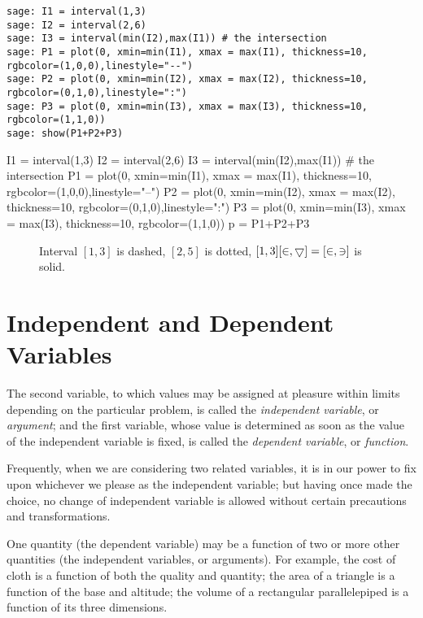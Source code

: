\begin{Verbatim}[fontsize=\tiny,fontfamily=courier,fontshape=tt,frame=single,label=\SAGE]
sage: I1 = interval(1,3)
sage: I2 = interval(2,6)
sage: I3 = interval(min(I2),max(I1)) # the intersection
sage: P1 = plot(0, xmin=min(I1), xmax = max(I1), thickness=10, rgbcolor=(1,0,0),linestyle="--")
sage: P2 = plot(0, xmin=min(I2), xmax = max(I2), thickness=10, rgbcolor=(0,1,0),linestyle=":")
sage: P3 = plot(0, xmin=min(I3), xmax = max(I3), thickness=10, rgbcolor=(1,1,0))
sage: show(P1+P2+P3)
\end{Verbatim}

\begin{sagesilent}
I1 = interval(1,3)
I2 = interval(2,6)
I3 = interval(min(I2),max(I1)) # the intersection
P1 = plot(0, xmin=min(I1), xmax = max(I1), thickness=10, rgbcolor=(1,0,0),linestyle="--")
P2 = plot(0, xmin=min(I2), xmax = max(I2), thickness=10, rgbcolor=(0,1,0),linestyle=":")
P3 = plot(0, xmin=min(I3), xmax = max(I3), thickness=10, rgbcolor=(1,1,0))
p = P1+P2+P3
\end{sagesilent}

\begin{figure}[h]
\begin{center}
\end{center}
\caption{Interval $[1,3]$ is dashed, $[2,5]$ is dotted, $[1,3]\cal [2,5]=[2,3]$ is solid.}
\label{fig:02:02}
\end{figure}

\section{Independent and Dependent Variables}
\label{sec:02:05}

The second variable, to which values may be assigned at pleasure within limits
depending on the particular problem, is called the \emph{independent variable},
or \emph{argument}; and the first variable, whose value is determined as soon
as the value of the independent variable is fixed, is called the
\emph{dependent variable}, or \emph{function}.

Frequently, when we are considering two related variables, it is in our power to
fix upon whichever we please as the independent variable; but having once made
the choice, no change of independent variable is allowed without certain
precautions and transformations.

One quantity (the dependent variable) may be a function of two or more other
quantities (the independent variables, or arguments).  For example, the cost of
cloth is a function of both the quality and quantity; the area of a triangle is
a function of the base and altitude; the volume of a rectangular parallelepiped
is a function of its three dimensions.

